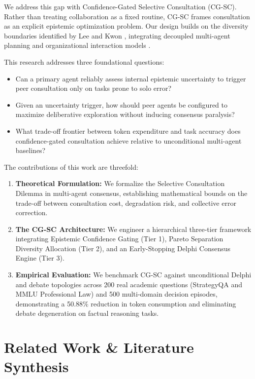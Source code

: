 \documentclass[conference]{IEEEtran}
\begin{document}
We address this gap with Confidence-Gated Selective Consultation (CG-SC). Rather than treating collaboration as a fixed routine, CG-SC frames consultation as an explicit epistemic optimization problem. Our design builds on the diversity boundaries identified by Lee and Kwon \cite{lee2026}, integrating decoupled multi-agent planning \cite{asik2023} and organizational interaction models \cite{goncalves2022}.

This research addresses three foundational questions:
\begin{itemize}
    \item Can a primary agent reliably assess internal epistemic uncertainty to trigger peer consultation only on tasks prone to solo error?
    \item Given an uncertainty trigger, how should peer agents be configured to maximize deliberative exploration without inducing consensus paralysis?
    \item What trade-off frontier between token expenditure and task accuracy does confidence-gated consultation achieve relative to unconditional multi-agent baselines?
\end{itemize}

The contributions of this work are threefold:
\begin{enumerate}
    \item \textbf{Theoretical Formulation:} We formalize the Selective Consultation Dilemma in multi-agent consensus, establishing mathematical bounds on the trade-off between consultation cost, degradation risk, and collective error correction.
    \item \textbf{The CG-SC Architecture:} We engineer a hierarchical three-tier framework integrating Epistemic Confidence Gating (Tier 1), Pareto Separation Diversity Allocation (Tier 2), and an Early-Stopping Delphi Consensus Engine (Tier 3).
    \item \textbf{Empirical Evaluation:} We benchmark CG-SC against unconditional Delphi and debate topologies across 200 real academic questions (StrategyQA and MMLU Professional Law) and 500 multi-domain decision episodes, demonstrating a 50.88\% reduction in token consumption and eliminating debate degeneration on factual reasoning tasks.
\end{enumerate}

\section{Related Work \& Literature Synthesis}
\end{document}
